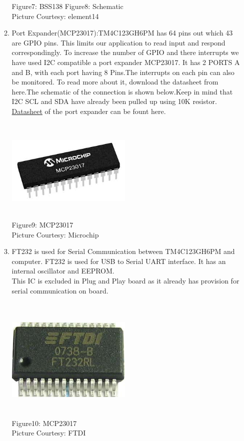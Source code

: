 \documentclass[a4paper,12pt,oneside]{book}
\begin{document}
\begin{itemize}
\begin{enumerate}
	Figure7: BSS138
	\hspace{3cm}
	Figure8: Schematic \\ 
	\hspace{6cm}
	Picture Courtesy: element14
	
	\item Port Expander(MCP23017):TM4C123GH6PM has 64 pins out which 43 are GPIO pins. This limits our application to read input and respond correspondingly. To increase the number of GPIO and there interrupts we have
	used I2C compatible a port expander MCP23017. It has 2 PORTS A and B, with each port having 8
	Pins.The interrupts on each pin can also be monitored. To read more about it, download the datasheet
	from here.The schematic of the connection is shown below.Keep in mind that I2C SCL and SDA have
	already been pulled up using 10K resistor.\href{./datasheet/MCP23017.pdf}{ Datasheet} of the port expander can be fount here. 
	\begin{center}
		\includegraphics[width=6cm, height=5cm]{Images/MCP23017}\\
		Figure9: MCP23017\\
		Picture Courtesy: Microchip
	\end{center}
	\item FT232 is used for Serial Communication between TM4C123GH6PM and computer. FT232 is used for USB to Serial UART interface. It has an internal oscillator and EEPROM. \\
	This IC is excluded in Plug and Play board as it already has provision for serial communication on board. \\
	\begin{center}
		\includegraphics[width=6cm, height=6cm]{Images/FT_232}\\
		Figure10: MCP23017\\
		Picture Courtesy: FTDI
	\end{center} 
	\end{enumerate}  

\end{itemize}
\end{document}
